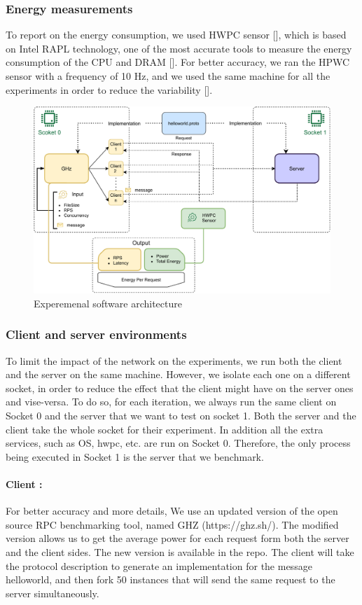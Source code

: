 \subsubsection{Energy measurements}
To report on the energy consumption, we used HWPC sensor [], which is based on Intel RAPL technology, one of the most accurate tools to measure the energy consumption of the CPU and DRAM []. For better accuracy, we ran the HPWC sensor with a frequency of 10 Hz, and we used the same machine for all the experiments in order to reduce the variability [].

\begin{figure}[!hbt]
    \begin{center}
        \includegraphics[width=.8\linewidth]{imgs/rpcprotocol}
    \end{center}
    \caption{Experemenal software architecture}\label{fig:rpcprotocol}
\end{figure}
\subsubsection{Client and server environments}

To limit the impact of the network on the experiments, we run both the client and the server on the same machine. However, we isolate each one on a different socket, in order to reduce the effect that the client might have on the server ones and vise-versa. To do so, for each iteration, we always run the same client on Socket 0 and the server that we want to test on socket 1. Both the server and the client take the whole socket for their experiment. In addition all the extra services, such as OS, hwpc, etc. are run on Socket 0. Therefore, the only process being executed in Socket 1 is the server that we benchmark.

\paragraph{Client :}
For better accuracy and more details, We use an updated version of the open source RPC benchmarking tool, named GHZ (https://ghz.sh/).
The modified version allows us to get the average power for each request form both the server and the client sides.
The new version is available in the repo.
The client will take the protocol description to generate an implementation for the message helloworld, and then fork 50 instances that will send the same request to the server simultaneously.

